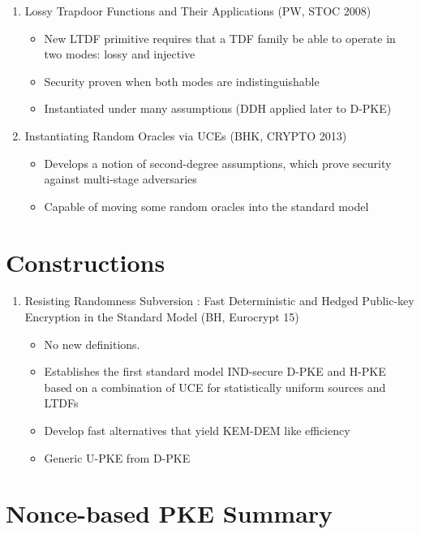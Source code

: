 \documentclass[11pt, pdftex]{article}
\begin{document}
\begin{enumerate}
\item Lossy Trapdoor Functions and Their Applications (PW, STOC 2008)
\begin{itemize}
\item New LTDF primitive requires that a TDF family be able to operate in two modes: lossy and injective
\item Security proven when both modes are indistinguishable
\item Instantiated under many assumptions (DDH applied later to D-PKE)
\end{itemize}

\item Instantiating Random Oracles via UCEs (BHK, CRYPTO 2013)
\begin{itemize}
\item Develops a notion of second-degree assumptions, which prove security against multi-stage adversaries
\item Capable of moving some random oracles into the standard model
\end{itemize}
\end{enumerate}

\section{Constructions}

\begin{enumerate}
\item Resisting Randomness Subversion : Fast Deterministic and Hedged Public-key Encryption in the Standard Model (BH, Eurocrypt 15)
\begin{itemize}
\item No new definitions.
\item Establishes the first standard model IND-secure D-PKE and H-PKE based on a combination of UCE for statistically uniform sources and LTDFs
\item Develop fast alternatives that yield KEM-DEM like efficiency
\item Generic U-PKE from D-PKE
\end{itemize}
\end{enumerate}

\section{Nonce-based PKE Summary}
\end{document}
